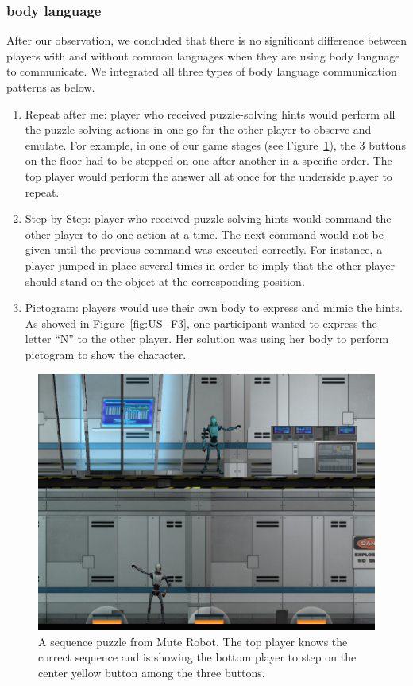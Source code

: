 \subsubsection{body language}
After our observation, we concluded that there is no significant difference between players with and without common languages when they are using body language to communicate. We integrated all three types of body language communication patterns as below.

\begin{enumerate}
  \item Repeat after me: player who received puzzle-solving hints would perform all the puzzle-solving actions in one go for the other player to observe and emulate. For example, in one of our game stages (see Figure~\ref{fig:US_F2}), the 3 buttons on the floor had to be stepped on one after another in a specific order. The top player would perform the answer all at once for the underside player to repeat. 
 
  \item Step-by-Step: player who received puzzle-solving hints would command the other player to do one action at a time. The next command would not be given until the previous command was executed correctly. For instance, a player jumped in place several times in order to imply that the other player should stand on the object at the corresponding position.
                                  
  \item Pictogram: players would use their own body to express and mimic the hints. As showed in Figure~\ref{fig:US_F3}, one participant wanted to express the letter ``N'' to the other player. Her solution was using her body to perform pictogram to show the character.
\end{enumerate}

\begin{figure}[!h]
\centering
\includegraphics[width=0.7\columnwidth]{Figures/US_F2.jpg}
\caption{A sequence puzzle from Mute Robot. The top player knows the correct sequence and is showing the bottom player to step on the center yellow button among the three buttons.}
\label{fig:US_F2}
\end{figure}

